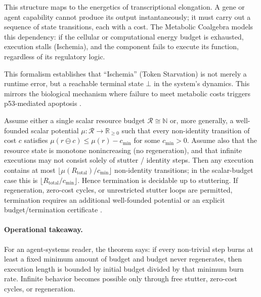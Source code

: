 This structure maps to the energetics of transcriptional elongation. A gene or agent capability cannot produce its output instantaneously; it must carry out a sequence of state transitions, each with a cost. The Metabolic Coalgebra models this dependency: if the cellular or computational energy budget is exhausted, execution stalls (Ischemia), and the component fails to execute its function, regardless of its regulatory logic.

This formalism establishes that ``Ischemia'' (Token Starvation) is not merely a runtime error, but a reachable terminal state $\bot$ in the system's dynamics. This mirrors the biological mechanism where failure to meet metabolic costs triggers p53-mediated apoptosis \cite{aubrey2018p53}.


\begin{theorem}\label{thm:metabolic-bound}
Assume either a single scalar resource budget $\mathcal{R} \cong \mathbb{N}$ or, more generally, a well-founded scalar potential $\mu: \mathcal{R} \to \mathbb{R}_{\ge 0}$ such that every non-identity transition of cost $c$ satisfies $\mu(r \ominus c) \le \mu(r) - c_{\min}$ for some $c_{\min} > 0$. Assume also that the resource state is monotone nonincreasing (no regeneration), and that infinite executions may not consist solely of stutter / identity steps. Then any execution contains at most $\lfloor \mu(R_{\mathrm{total}}) / c_{\min} \rfloor$ non-identity transitions; in the scalar-budget case this is $\lfloor R_{\mathrm{total}} / c_{\min} \rfloor$. Hence termination is decidable up to stuttering. If regeneration, zero-cost cycles, or unrestricted stutter loops are permitted, termination requires an additional well-founded potential or an explicit budget/termination certificate \cite{boreale2023weighted}.
\end{theorem}

\paragraph{Operational takeaway.}
For an agent-systems reader, the theorem says: if every non-trivial step burns at least a fixed minimum amount of budget and budget never regenerates, then execution length is bounded by initial budget divided by that minimum burn rate. Infinite behavior becomes possible only through free stutter, zero-cost cycles, or regeneration.


